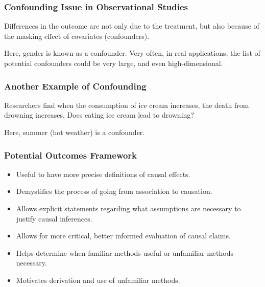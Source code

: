 \subsubsection*{Confounding Issue in Observational Studies}
\begin{Example}{}
    Differences in the outcome are not only due to the treatment, but
    also because of the masking effect of covariates (confounders).
    \begin{center}
    \end{center}
    Here, gender is known as a confounder. Very often, in real
    applications, the list of potential confounders could be very large,
    and even high-dimensional.
\end{Example}
\subsubsection*{Another Example of Confounding}
\begin{Example}{}
    Researchers find when the consumption of ice cream increases, the
    death from drowning increases. Does eating ice cream lead to
    drowning?
    \begin{center}
    \end{center}
    Here, summer (hot weather) is a confounder.
\end{Example}
\subsubsection*{Potential Outcomes Framework}
\begin{itemize}
    \item Useful to have more precise definitions of causal effects.
    \item Demystifies the process of going from association to causation.
    \item Allows explicit statements regarding what assumptions are
          necessary to justify causal inferences.
    \item Allows for more critical, better informed evaluation of causal
          claims.
    \item Helps determine when familiar methods useful or unfamiliar
          methods necessary.
    \item Motivates derivation and use of unfamiliar methods.
\end{itemize}

